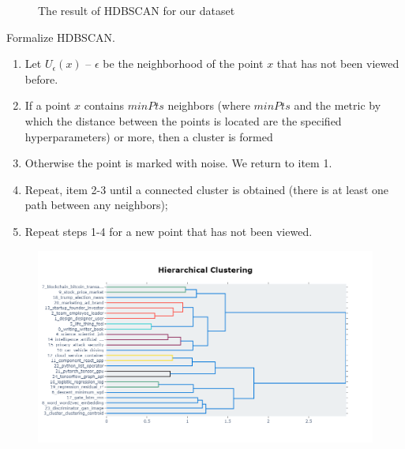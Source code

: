 \documentclass[12pt]{report}
\begin{document}
\begin{enumerate}
\begin{figure}
\caption{The result of HDBSCAN for our dataset}
\label{fig:hdbscan}
\end{figure}
\end{enumerate}
Formalize HDBSCAN.
\begin{enumerate}
\item Let $U_\epsilon(x)$ -- $\epsilon$ be the neighborhood of the point $x$ that has not been viewed before.
\item If a point $x$ contains $minPts$ neighbors (where $minPts$ and the metric by which the distance between the points is located are the specified hyperparameters) or more, then a cluster is formed
\item Otherwise the point is marked with noise. We return to item 1.
\item Repeat, item 2-3 until a connected cluster is obtained (there is at least one path between any neighbors);
\item Repeat steps 1-4 for a new point that has not been viewed.
\end{enumerate}
\begin{figure}[H]
    \centering
    \includegraphics[scale=0.4]{hierarchy.png}
\end{figure}
\end{document}
